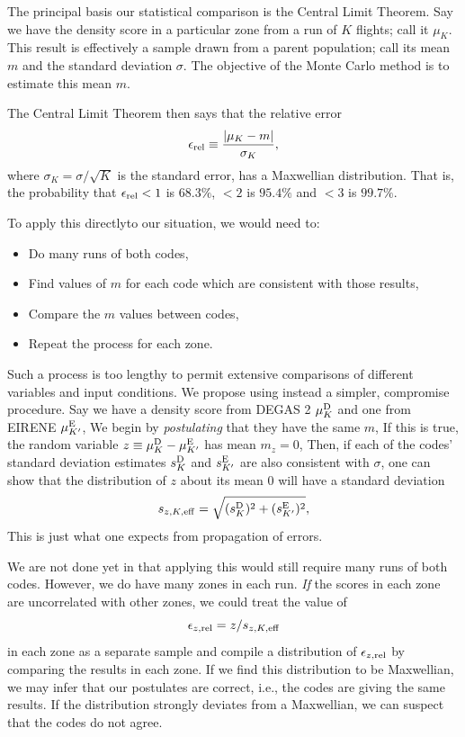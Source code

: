 \documentclass[12pt]{report}
\begin{document}
The principal basis our statistical comparison is the Central Limit 
Theorem\cite{Span69}. Say we have the density score in a particular zone 
from a run of
$K$ flights; call it $\mu_{K}$. This result is effectively a sample 
drawn from a parent population; call its mean $m$ and the 
standard deviation $\sigma$. The objective of the Monte Carlo method is 
to estimate this mean $m$.

The Central Limit Theorem then says that the relative error
\begin{equation}
\epsilon_{\rm rel} \equiv \frac{ | \mu_{K} - m | }{ \sigma_{K} },
\end{equation}
where $\sigma_{K} = \sigma / \sqrt{K}$ is the standard error,
has a Maxwellian distribution.
That is, the probability that $\epsilon_{\rm rel} < 1$ is 
$68.3 \%$, $< 2$ is $95.4 \%$ and $< 3$ is $99.7 \%$.

To apply this directlyto our situation, we would need to:
\begin{itemize}
  \item Do many runs of both codes, 
  \item Find values of $m$ for each code which are consistent with
those results,
  \item Compare the $m$ values between codes,
  \item Repeat the process for each zone.
\end{itemize}
 
Such a process is too lengthy to permit extensive comparisons
of different variables and input conditions. We propose using
instead a simpler, compromise procedure.
Say we have a density score from DEGAS 2 $\mu^{\rm D}_{K}$ and
one from EIRENE $\mu^{\rm E}_{K^{\prime}}$,
We begin by {\em postulating} that they have the same $m$,
If this is true, the random variable $z \equiv \mu^{\rm D}_{K}
- \mu^{\rm E}_{K^{\prime}}$ has mean $m_{z} = 0$,
Then, if each of the codes' standard deviation estimates
$s^{\rm D}_{K}$ and $s^{\rm E}_{K^{\prime}}$ are also consistent with
$\sigma$, one can show that the distribution of $z$ about its
mean $0$ will have a standard deviation
\begin{equation}
s_{z,K,{\rm eff}} = \sqrt{(s^{\rm D}_{K})^{2} 
+ (s^{\rm E}_{K^{\prime}})^{2}},
\end{equation}
This is just what one expects from propagation of errors.

We are not done yet in that applying this would still require
many runs of both codes.
However, we do have many zones in each run.
{\em If} the scores in each zone are uncorrelated with other
zones, we could treat the value of 
\begin{equation}
\epsilon_{z,{\rm rel}} = 
z / s_{z,K,{\rm eff}}
\label{epsilonrel}
\end{equation}
in each
zone as a separate sample and compile a distribution of 
$\epsilon_{z,{\rm rel}}$ by comparing the results in each zone.
If we find this distribution to be Maxwellian, we may infer that our 
postulates are correct, i.e., the codes are giving the same results.
If the distribution strongly deviates from a Maxwellian, we can suspect
that the codes do not agree.
\end{document}
